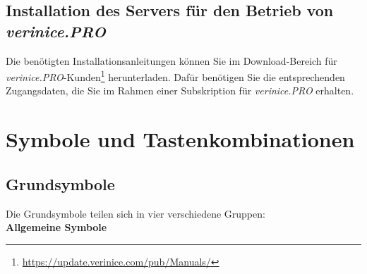 \documentclass[a4paper,10pt]{book}
\begin{document}
\section{Installation des Servers für den Betrieb von \textit{verinice.PRO}}

Die benötigten Installationsanleitungen können Sie im Download-Bereich für
\textit{verinice.PRO}-Kunden\footnote{\url{https://update.verinice.com/pub/Manuals/}}
herunterladen. Dafür benötigen Sie die entsprechenden Zugangsdaten, die Sie im
Rahmen einer Subskription für \textit{verinice.PRO} erhalten.


\chapter{Symbole und Tastenkombinationen}

\section{Grundsymbole}
Die Grundsymbole teilen sich in vier verschiedene Gruppen:
\newline\\
\textbf{Allgemeine Symbole}
\end{document}
